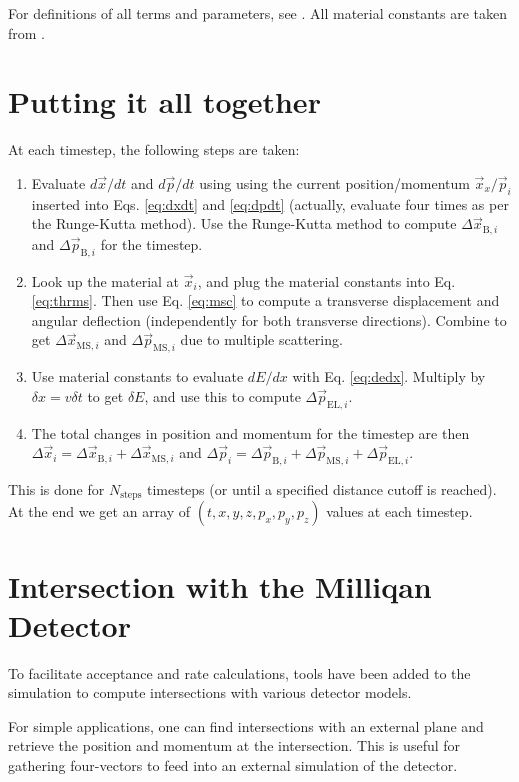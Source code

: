 \documentclass[12pt]{article}
\begin{document}
For definitions of all terms and parameters, see \cite{PDG_matter}. All material constants are taken from \cite{PDG_properties}.

\section{Putting it all together}
At each timestep, the following steps are taken:
\begin{enumerate}
\item Evaluate $d\vec{x}/dt$ and $d\vec{p}/dt$ using using the current position/momentum $\vec{x}_x/\vec{p}_i$ inserted into Eqs. \ref{eq:dxdt} and \ref{eq:dpdt} (actually,
evaluate four times as per the Runge-Kutta method). Use the Runge-Kutta method to compute $\Delta\vec{x}_{\text{B},i}$ and $\Delta\vec{p}_{\text{B},i}$ for the timestep.
\item Look up the material at $\vec{x}_i$, and plug the material constants into Eq. \ref{eq:thrms}. Then use Eq. \ref{eq:msc} to compute a transverse displacement
and angular deflection (independently for both transverse directions). Combine to get $\Delta\vec{x}_{\text{MS},i}$ and $\Delta\vec{p}_{\text{MS},i}$ due to multiple scattering.
\item Use material constants to evaluate $dE/dx$ with Eq. \ref{eq:dedx}. Multiply by $\delta x=v\delta t$ to get $\delta E$, and use this to compute $\Delta\vec{p}_{\text{EL},i}$.
\item The total changes in position and momentum for the timestep are then $\Delta\vec{x}_i = \Delta\vec{x}_{\text{B},i}+\Delta\vec{x}_{\text{MS},i}$ and
$\Delta\vec{p}_i = \Delta\vec{p}_{\text{B},i}+\Delta\vec{p}_{\text{MS},i}+\Delta\vec{p}_{\text{EL},i}$.
\end{enumerate}

This is done for $N_\text{steps}$ timesteps (or until a specified distance cutoff is reached). At the end we get an array of $(t,x,y,z,p_x,p_y,p_z)$ values at each timestep.

\section{Intersection with the Milliqan Detector}
To facilitate acceptance and rate calculations, tools have been added to the simulation to compute intersections with
various detector models.

For simple applications, one can find intersections with an external plane and retrieve the position and momentum
at the intersection. This is useful for gathering four-vectors to feed into an external simulation of the detector.
\end{document}
